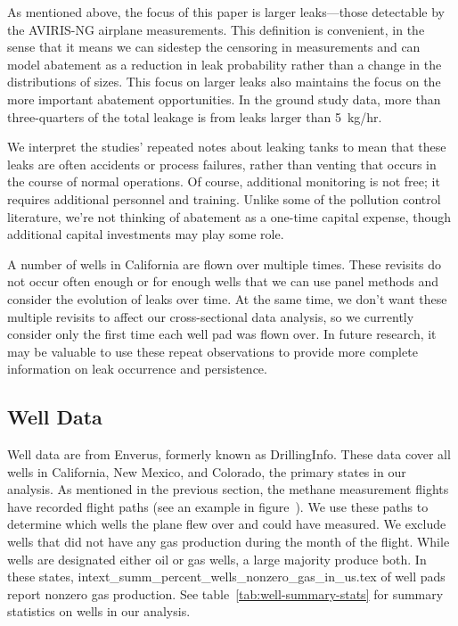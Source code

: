 As mentioned above, the focus of this paper is larger leaks---those detectable by the \gls{AVIRIS-NG} airplane measurements.
This definition is convenient, in the sense that it means we can sidestep the censoring in measurements and can model abatement as a reduction in leak probability rather than a change in the distributions of sizes.
This focus on larger leaks also maintains the focus on the more important abatement opportunities.
In the ground study data, more than three-quarters of the total leakage is from leaks larger than 5~kg/hr.


We interpret the studies' repeated notes about leaking tanks to mean that these leaks are often accidents or process failures, rather than venting that occurs in the course of normal operations.
Of course, additional monitoring is not free; it requires additional personnel and training.
Unlike some of the pollution control literature, we're not thinking of abatement as a one-time capital expense, though additional capital investments may play some role.


A number of wells in California are flown over multiple times.
These revisits do not occur often enough or for enough wells that we can use panel methods and consider the evolution of leaks over time.
At the same time, we don't want these multiple revisits to affect our cross-sectional data analysis, so we currently consider only the first time each well pad was flown over.
In future research, it may be valuable to use these repeat observations to provide more complete information on leak occurrence and persistence.


\subsection{Well Data}
\label{sec:well-data}
Well data are from Enverus, formerly known as DrillingInfo.
These data cover all wells in California, New Mexico, and Colorado, the primary states in our analysis.
As mentioned in the previous section, the methane measurement flights have recorded flight paths (see an example in figure~\iftoggle{usexr}{\ref{fig:frankenberg-measurement-figs}}{A6}).
We use these paths to determine which wells the plane flew over and could have measured.
We exclude wells that did not have any gas production during the month of the flight.
While wells are designated either oil or gas wells, a large majority produce both.
In these states,
{intext_summ_percent_wells_nonzero_gas_in_us.tex}
of well pads report nonzero gas production.
See table~\ref{tab:well-summary-stats} for summary statistics on wells in our analysis.



